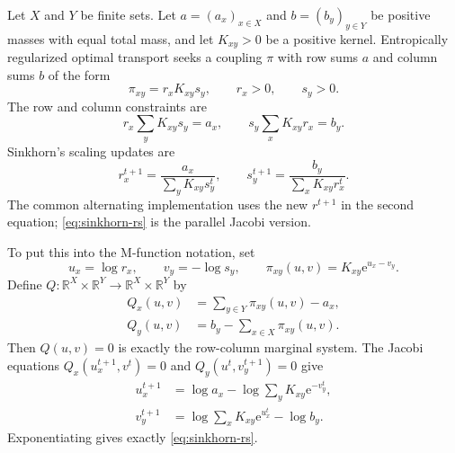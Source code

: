 \documentclass[11pt]{article}
\newcommand{\R}{\mathbb{R}}
\newcommand{\e}{\mathrm{e}}
\theoremstyle{definition}
\theoremstyle{plain}
\begin{document}
Let $X$ and $Y$ be finite sets. Let $a=(a_x)_{x\in X}$ and $b=(b_y)_{y\in Y}$ be positive masses with equal total mass, and let $K_{xy}>0$ be a positive kernel. Entropically regularized optimal transport seeks a coupling $\pi$ with row sums $a$ and column sums $b$ of the form
\begin{equation}\label{eq:scalingform}
        \pi_{xy}=r_x K_{xy}s_y,
        \qquad r_x>0,\qquad s_y>0.
\end{equation}
The row and column constraints are
\[
        r_x\sum_y K_{xy}s_y=a_x,
        \qquad
        s_y\sum_x K_{xy}r_x=b_y.
\]
Sinkhorn's scaling updates are
\begin{equation}\label{eq:sinkhorn-rs}
        r_x^{t+1}=\frac{a_x}{\sum_y K_{xy}s_y^t},
        \qquad
        s_y^{t+1}=\frac{b_y}{\sum_x K_{xy}r_x^t}.
\end{equation}
The common alternating implementation uses the new $r^{t+1}$ in the second equation; \eqref{eq:sinkhorn-rs} is the parallel Jacobi version.

To put this into the M-function notation, set
\[
        u_x=\log r_x,
        \qquad
        v_y=-\log s_y,
        \qquad
        \pi_{xy}(u,v)=K_{xy}\e^{u_x-v_y}.
\]
Define $Q:\R^X\times\R^Y\to\R^X\times\R^Y$ by
\begin{align}
        Q_x(u,v) &= \sum_{y\in Y}\pi_{xy}(u,v)-a_x,\label{eq:Qsinkx}\\
        Q_y(u,v) &= b_y-\sum_{x\in X}\pi_{xy}(u,v).\label{eq:Qsinky}
\end{align}
Then $Q(u,v)=0$ is exactly the row-column marginal system. The Jacobi equations $Q_x(u_x^{t+1},v^t)=0$ and $Q_y(u^t,v_y^{t+1})=0$ give
\begin{align*}
        u_x^{t+1}
        &=\log a_x-\log\sum_yK_{xy}\e^{-v_y^t},\\
        v_y^{t+1}
        &=\log\sum_xK_{xy}\e^{u_x^t}-\log b_y.
\end{align*}
Exponentiating gives exactly \eqref{eq:sinkhorn-rs}.
\end{document}
